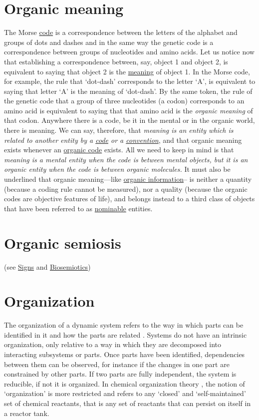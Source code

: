 \documentclass[12pt]{article}
\begin{document}
\section{Organic meaning}
The Morse \hyperlink{code}{code} is a correspondence between the letters of the alphabet and groups of dots and dashes and in the same way the genetic code is a correspondence between groups of nucleotides and amino acids. Let us notice now that establishing a correspondence between, say, object 1 and object 2, is equivalent to saying that object 2 is the \hyperlink{meaning}{meaning} of object 1. In the Morse code, for example, the rule that `dot-dash' corresponds to the letter `A', is equivalent to saying that letter `A' is the meaning of `dot-dash'. By the same token, the rule of the genetic code that a group of three nucleotides (a codon) corresponds to an amino acid is equivalent to saying that that amino acid is the \textit{organic meaning} of that codon. Anywhere there is a code, be it in the mental or in the organic world, there is meaning. We can say, therefore, that \textit{meaning is an entity which is related to another entity by a \hyperlink{code}{code} or a \hyperlink{convention}{convention}}, and that organic meaning exists whenever an \hyperlink{organic_codes}{organic code} exists. All we need to keep in mind is that \textit{meaning is a mental entity when the code is between mental objects, but it is an organic entity when the code is between organic molecules.} It must also be underlined that organic meaning---like \hyperlink{organic_information}{organic information}-- is neither a \hypertarget{physical_quantities}{quantity} (because a coding rule cannot be measured), nor a quality (because the organic codes are objective features of life), and belongs instead to a third class of objects that have been referred to as \hyperlink{nominable_entities}{nominable} entities.


\hypertarget{organic_semiosis}{}
\section{Organic semiosis} (see \hyperlink{signs}{Signs} and \hyperlink{biosemiotics}{Biosemiotics})

\hypertarget{organization}{}
\section{Organization} 
The organization of a dynamic system refers to the way in which parts
can be identified in it and how the parts are related
\cite{ashby62:_principles_self_organizing_system}.  Systems do not
have an intrinsic organization, only relative to a way in which they
are decomposed into interacting subsystems or parts. Once parts have
been identified, dependencies between them can be observed, for
instance if the changes in one part are constrained by other parts. If
two parts are fully independent, the system is reducible, if not it is
organized. In chemical organization theory
\cite{dittrich07:_chemic_organ_theor}, the notion of `organization' is
more restricted and refers to any `closed' and `self-maintained' set
of chemical reactants, that is any set of reactants that can persist
on itself in a reactor tank. 
\end{document}
